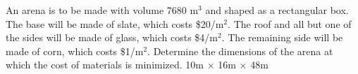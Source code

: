 {An arena is to be made with volume 7680 m$^3$ and shaped as a rectangular box.  The base will be made of slate, which costs \$20/m$^2$.  The roof and all but one of the sides will be made of glass, which costs \$4/m$^2$.  The remaining side will be made of corn, which costs \$1/m$^2$.  Determine the dimensions of the arena at which the cost of materials is minimized.
}
{
10m $\times$ 16m $\times$ 48m
}